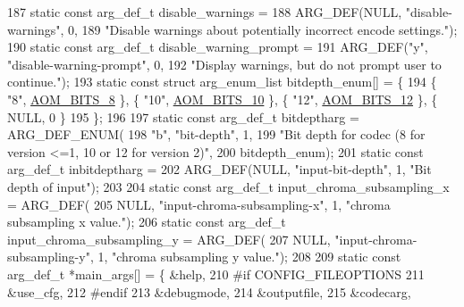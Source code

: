 \begin{DoxyCodeInclude}
{{187 \textcolor{keyword}{static} \textcolor{keyword}{const} arg\_def\_t disable\_warnings =
188     ARG\_DEF(NULL, \textcolor{stringliteral}{"disable-warnings"}, 0,
189             \textcolor{stringliteral}{"Disable warnings about potentially incorrect encode settings."});
190 \textcolor{keyword}{static} \textcolor{keyword}{const} arg\_def\_t disable\_warning\_prompt =
191     ARG\_DEF(\textcolor{stringliteral}{"y"}, \textcolor{stringliteral}{"disable-warning-prompt"}, 0,
192             \textcolor{stringliteral}{"Display warnings, but do not prompt user to continue."});
193 \textcolor{keyword}{static} \textcolor{keyword}{const} \textcolor{keyword}{struct }arg\_enum\_list bitdepth\_enum[] = \{
194   \{ \textcolor{stringliteral}{"8"}, \hyperlink{group__codec_gga6ed0e98eba4651c1ad845e39498e4153a4c7f55539160206a3fbb2a6cfc9ef89c}{AOM\_BITS\_8} \}, \{ \textcolor{stringliteral}{"10"}, \hyperlink{group__codec_gga6ed0e98eba4651c1ad845e39498e4153a91734384f432233c3d681052122ab8e7}{AOM\_BITS\_10} \}, \{ \textcolor{stringliteral}{"12"}, 
      \hyperlink{group__codec_gga6ed0e98eba4651c1ad845e39498e4153a15836a87f9e9940885d5ef59a52bf728}{AOM\_BITS\_12} \}, \{ NULL, 0 \}
195 \};
196 
197 \textcolor{keyword}{static} \textcolor{keyword}{const} arg\_def\_t bitdeptharg = ARG\_DEF\_ENUM(
198     \textcolor{stringliteral}{"b"}, \textcolor{stringliteral}{"bit-depth"}, 1,
199     \textcolor{stringliteral}{"Bit depth for codec (8 for version <=1, 10 or 12 for version 2)"},
200     bitdepth\_enum);
201 \textcolor{keyword}{static} \textcolor{keyword}{const} arg\_def\_t inbitdeptharg =
202     ARG\_DEF(NULL, \textcolor{stringliteral}{"input-bit-depth"}, 1, \textcolor{stringliteral}{"Bit depth of input"});
203 
204 \textcolor{keyword}{static} \textcolor{keyword}{const} arg\_def\_t input\_chroma\_subsampling\_x = ARG\_DEF(
205     NULL, \textcolor{stringliteral}{"input-chroma-subsampling-x"}, 1, \textcolor{stringliteral}{"chroma subsampling x value."});
206 \textcolor{keyword}{static} \textcolor{keyword}{const} arg\_def\_t input\_chroma\_subsampling\_y = ARG\_DEF(
207     NULL, \textcolor{stringliteral}{"input-chroma-subsampling-y"}, 1, \textcolor{stringliteral}{"chroma subsampling y value."});
208 
209 \textcolor{keyword}{static} \textcolor{keyword}{const} arg\_def\_t *main\_args[] = \{ &help,
210 \textcolor{preprocessor}{#if CONFIG\_FILEOPTIONS}
211                                         &use\_cfg,
212 \textcolor{preprocessor}{#endif}
213                                         &debugmode,
214                                         &outputfile,
215                                         &codecarg,
}}
\end{DoxyCodeInclude}
